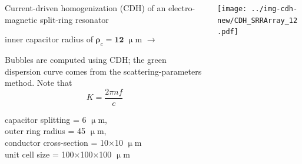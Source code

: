 \documentclass[t]{beamer} \usepackage[english]{babel} \usepackage[utf8]{inputenc} \usetheme{Frankfurt} %
\begin{document}
\begin{frame}[plain]{}%
\begin{columns}[T] %
	\begin{column}{.55\textwidth}
	\vspace{3mm}
	\noindent Current-driven homogenization (CDH) of an electro-magnetic split-ring resonator 
	\begin{exampleblock}\hfill inner capacitor radius of $\pmb\rho_c=\pmb{12}\;\upmu$m $\rightarrow$\end{exampleblock}
	\vspace{3mm}

	\noindent Bubbles are computed using CDH; the green dispersion curve comes from the scattering-parameters method. Note that $$K = \frac{2\pi n f}{c}$$
	\vspace{12mm}

	\small{capacitor splitting = 6 $\upmu$m,\\ outer ring radius = 45 $\upmu$m,\\ conductor cross-section = 10$\times$10 $\upmu$m\\ unit cell size = 100$\times$100$\times$100 $\upmu$m}
	\vspace{5mm}

	\end{column}%
	\begin{column}{.45\textwidth}%
		\vspace{-1mm}\texttt{[image: ../img-cdh-new/CDH\_SRRArray\_12.pdf]} 
	\end{column}
\end{columns}
\end{frame} 		%
\end{document}
